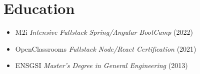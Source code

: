 \documentclass[a4paper,10pt]{article}
\begin{document}
\begin{minipage}[t]{0.3\textwidth}
  \section*{Education}
  \begin{tcolorbox}[cvbox, width=\linewidth]
    \begin{itemize}[leftmargin=*]
      \item M2i \textit{Intensive Fullstack Spring/Angular BootCamp} (2022)
      \item OpenClassrooms \textit{Fullstack Node/React Certification} (2021)
      \item ENSGSI \textit{Master's Degree in General Engineering} (2013)
    \end{itemize}
  \end{tcolorbox}
\end{minipage}
\hfill
\end{document}
